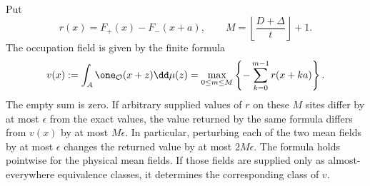 \begin{lemma}
\label{lem:two-field-prefix}
Put
\begin{equation}\label{eq:two-field-increment}
 r(x)=F_+(x)-F_-(x+a),\qquad
 M=\left\lfloor\frac{D+\Delta}{t}\right\rfloor+1.
\end{equation}
The occupation field is given by the finite formula
\begin{equation}\label{eq:two-field-prefix-inverse}
 v(x):=\int_A\one_{\mathcal O}(x+z)\dd\mu(z)
 =\max_{0\le m\le M}
       \left\{-\sum_{k=0}^{m-1}r(x+ka)\right\}.
\end{equation}
The empty sum is zero.  If arbitrary supplied values of $r$ on
these $M$ sites differ by at most $\epsilon$ from the exact values,
the value returned by the same formula differs from $v(x)$ by at
most $M\epsilon$.  In particular, perturbing each of the two mean
fields by at most $\epsilon$ changes the returned value by at most
$2M\epsilon$.  The formula holds pointwise for the physical mean
fields.  If those fields are supplied only as almost-everywhere
equivalence classes, it determines the corresponding class of $v$.
\end{lemma}
